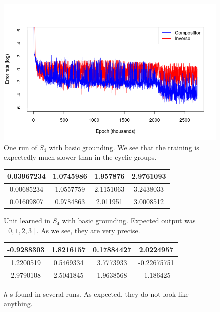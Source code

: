 \begin{figure}
\caption{One run of $S_4$ with basic grounding. We see that the training is expectedly much slower than in the cyclic groups.}
\label{graph:s4_basic}
\includegraphics[width=0.9\linewidth]{../img/s4_comp+inv.png}
\end{figure}

\begin{figure}
\center
\caption{Unit learned in $S_4$ with basic grounding. Expected output was $[0,1,2,3]$. As we see, they are very precise.}
\label{table:s4_unit_basic}
\begin{tabular}{cccc}
0.03967234 & 1.0745986 & 1.957876 & 2.9761093\\
\hline
0.00685234 & 1.0557759 & 2.1151063 & 3.2438033\\
\hline
0.01609807 & 0.9784863 & 2.011951 & 3.0008512\\
\end{tabular}
\end{figure}

\begin{figure}
\center
\caption{$h$-s found in several runs. As expected, they do not look like anything.}
\label{table:s4_half_basic}
\begin{tabular}{cccc}
-0.9288303 & 1.8216157 & 0.17884427 & 2.0224957\\
\hline
1.2200519 & 0.5469334 & 3.7773933 & -0.22675751\\
 \hline
2.9790108 & 2.5041845 & 1.9638568 & -1.186425\\
\hline
\end{tabular}
\end{figure}

